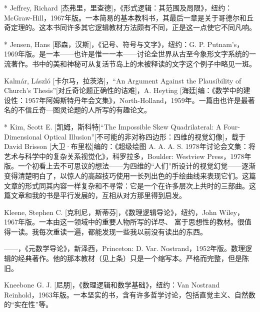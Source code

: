 \begin{thebib}
\begin{biblist}
\item[*] Jeffrey, Richard [杰弗里，里查德]，《形式逻辑：其范围及局限》，纽约：McGraw-Hill，1967年版。一本简易的基本教科书，其最后一章是关于哥德尔和丘奇定理的。这本书同许多其它逻辑教材方法颇有不同，正是这一点使它不同凡响。

\item[*] Jensen, Hans [耶森，汉斯]，《记号、符号与文字》，纽约：G. P. Putnam's，1969年版。是一本——也许是惟一一本——讨论全世界从古至今象形文字系统的一流著作。书中的美和神秘可从复活节岛上的未被释读的文字这个例子中略见一斑。

\item Kalmár, László [卡尔马，拉茨洛]，“An Argument Against the Plausibility of Church's Thesis”[对丘奇论题正确性的诘难]，A. Heyting [海廷]编：《数学中的建设性：1957年阿姆斯特丹年会文集》，North-Holland，1959年。一篇由也许是最著名的不信丘奇—图灵论题的人所写的有趣论文。

\item[*] Kim, Scott E. [凯姆，斯科特]“The Impossible Skew Quadrilateral: A Four-Dimensional Optical Illusion”[不可能的非对称四边形：四维的视觉幻像]，载于David Brisson [大卫·布里松]编的：《超级绘图 A. A. A. S. 1978年讨论会文集：将艺术与科学中的复杂关系视觉化》，科罗拉多，Boulder: Westview Press，1978年版。一个初看上去不可思议的想法——为四维的“人们”所设计的视觉幻觉——逐渐变得清楚明白了，以惊人的高超技巧使用一长列出色的手绘曲线来表现它们。这篇文章的形式同其内容一样复杂和不寻常：它是一个在许多层次上共时的三部曲。这篇文章和我的书是平行发展的，互相从对方那里得到启发。

\item Kleene, Stephen C. [克利尼，斯蒂芬]，《数理逻辑导论》，纽约，John Wiley，1967年版。一本由这一领域中的重要人物所写的详尽、 富于思想性的教材。很值得一读。我每次重读一遍，都能发现一些我以前没有读出的东西。

\item ——，《元数学导论》，新泽西，Princeton: D. Var. Nostrand，1952年版。数理逻辑的经典著作。他的那本教材（见上条）只是一个缩写本。严格而完整，但是陈旧。

\item Kneebone G. J. [尼朋]，《数理逻辑和数学基础》，纽约：Van Nostrand Reinhold，1963年版。一本坚实的书，含有许多哲学讨论，包括直觉主义、自然数的“实在性”等。


\end{biblist}
\end{thebib}

